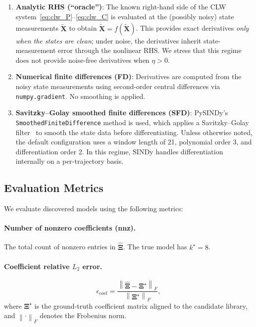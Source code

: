 \documentclass[12pt]{article}
\newcommand{\bX}{\mathbf{X}}
\newcommand{\bXi}{\boldsymbol{\Xi}}
\newcommand{\norm}[1]{\left\lVert #1 \right\rVert}
\begin{document}
\begin{enumerate}
\item \textbf{Analytic RHS (``oracle'')}: The known right-hand side of the CLW system~\eqref{eq:clw_P}--\eqref{eq:clw_C} is evaluated at the (possibly noisy) state measurements $\tilde{\bX}$ to obtain $\dot{\tilde{\bX}} = f(\tilde{\bX})$.
This provides exact derivatives \emph{only when the states are clean}; under noise, the derivatives inherit state-measurement error through the nonlinear RHS.
We stress that this regime does not provide noise-free derivatives when $\eta > 0$.

\item \textbf{Numerical finite differences (FD)}: Derivatives are computed from the noisy state measurements using second-order central differences via \texttt{numpy.gradient}.
No smoothing is applied.

\item \textbf{Savitzky--Golay smoothed finite differences (SFD)}: PySINDy's \texttt{SmoothedFiniteDifference} method is used, which applies a Savitzky--Golay filter~\cite{Savitzky1964} to smooth the state data before differentiating.
Unless otherwise noted, the default configuration uses a window length of 21, polynomial order 3, and differentiation order 2.
In this regime, SINDy handles differentiation internally on a per-trajectory basis.
\end{enumerate}

\subsection{Evaluation Metrics}
\label{sec:metrics}

We evaluate discovered models using the following metrics:

\paragraph{Number of nonzero coefficients (nnz).}
The total count of nonzero entries in $\hat{\bXi}$.
The true model has $k^\star = 8$.

\paragraph{Coefficient relative $L_2$ error.}
\begin{equation}
\epsilon_\text{coef} = \frac{\norm{\hat{\bXi} - \bXi^\star}_F}{\norm{\bXi^\star}_F},
\end{equation}
where $\bXi^\star$ is the ground-truth coefficient matrix aligned to the candidate library, and $\norm{\cdot}_F$ denotes the Frobenius norm.
\end{document}
